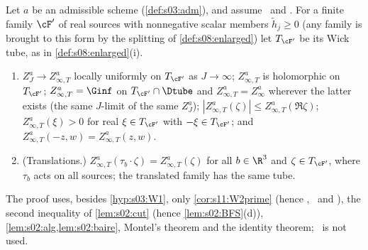 \begin{proposition}\label{prop:s08:T}
Let $a$ be an admissible scheme (\cref{def:s03:adm}), and assume \Itwo\ and \Ithree. For a finite family $\cF'$ of real sources with nonnegative scalar members $\tilde h_j\ge0$ (any family is brought to this form by the splitting of \cref{def:s08:enlarged}) let $T_{\cF'}$ be its Wick tube, as in \cref{def:s08:enlarged}(i).
\begin{enumerate}[label=\textup{(\alph*)},leftmargin=*,nosep]
\item $Z^a_J\to Z^a_{\infty,T}$ locally uniformly on $T_{\cF'}$ as $J\to\infty$; $Z^a_{\infty,T}$ is holomorphic on $T_{\cF'}$; $Z^a_{\infty,T}=\Ginf$ on $T_{\cF'}\cap\Dtube$ and $Z^a_{\infty,T}=Z^a_\infty$ wherever the latter exists (the same $J$-limit of the same $Z^a_J$); $|Z^a_{\infty,T}(\zeta)|\le Z^a_{\infty,T}(\Re\zeta)$; $Z^a_{\infty,T}(\xi)>0$ for real $\xi\in T_{\cF'}$ with $-\xi\in T_{\cF'}$; and $Z^a_{\infty,T}(-z,w)=Z^a_{\infty,T}(z,w)$.
\item \textup{(Translations.)} $Z^a_{\infty,T}(\tau_b\cdot\zeta)=Z^a_{\infty,T}(\zeta)$ for all $b\in\R^3$ and $\zeta\in T_{\cF'}$, where $\tau_b$ acts on all sources; the translated family has the same tube.
\end{enumerate}
The proof uses, besides \cref{hyp:s03:W1}, only \cref{cor:s11:W2prime} (hence \Itwo, \Ithree\ and \cite[Thm.~6.2(1),(2)]{BFS1}), the second inequality of \cref{lem:s02:cut} (hence \cref{lem:s02:BFS}(d)), \cref{lem:s02:alg,lem:s02:baire}, Montel's theorem and the identity theorem; \Wtwo\ is not used.
\end{proposition}

